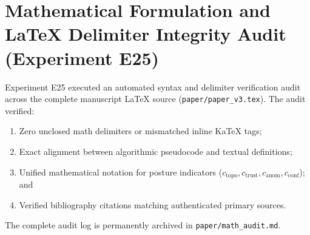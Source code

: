 \section{Mathematical Formulation and LaTeX Delimiter Integrity Audit (Experiment E25)}
\label{app:math_audit}

Experiment E25 executed an automated syntax and delimiter verification audit across the complete manuscript LaTeX source (\texttt{paper/paper\_v3.tex}). The audit verified: 
\begin{enumerate}
  \item Zero unclosed math delimiters or mismatched inline KaTeX tags;
  \item Exact alignment between algorithmic pseudocode and textual definitions;
  \item Unified mathematical notation for posture indicators ($c_{\text{topo}}, c_{\text{trust}}, c_{\text{anom}}, c_{\text{conf}}$); and
  \item Verified bibliography citations matching authenticated primary sources.
\end{enumerate}
The complete audit log is permanently archived in \texttt{paper/math\_audit.md}.

